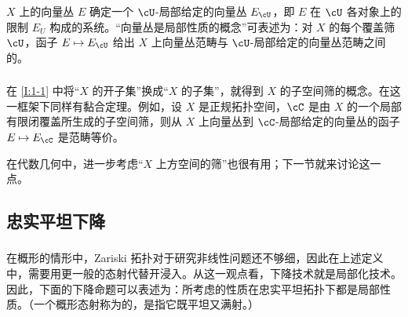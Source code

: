 \subsubsection{}\label{I:1-3-3}
$X$ 上的向量丛 $E$ 确定一个 $\cU$-局部给定的向量丛 $E_\cU$，即 $E$ 在 $\cU$ 各对象上的限制 $E_U$ 构成的系统。“向量丛是局部性质的概念”可表述为：对 $X$ 的每个覆盖筛 $\cU$，函子 $E\mapsto E_\cU$ 给出 $X$ 上向量丛范畴与 $\cU$-局部给定的向量丛范畴之间的。

\subsubsection{}\label{I:1-3-4}
在 \ref{I:1-1} 中将“$X$ 的开子集”换成“$X$ 的子集”，就得到 $X$ 的子空间筛的概念。在这一框架下同样有黏合定理。例如，设 $X$ 是正规拓扑空间，$\cC$ 是由 $X$ 的一个局部有限闭覆盖所生成的子空间筛，则从 $X$ 上向量丛到 $\cC$-局部给定的向量丛的函子 $E\mapsto E_\cC$ 是范畴等价。

在代数几何中，进一步考虑“$X$ 上方空间的筛”也很有用；下一节就来讨论这一点。

\subsection{忠实平坦下降}\label{I:1-4}
\subsubsection{}\label{I:1-4-1}
在概形的情形中，Zariski 拓扑对于研究非线性问题还不够细，因此在上述定义中，需要用更一般的态射代替开浸入。从这一观点看，下降技术就是局部化技术。因此，下面的下降命题可以表述为：所考虑的性质在忠实平坦拓扑下都是局部性质。（一个概形态射称为的，是指它既平坦又满射。）

